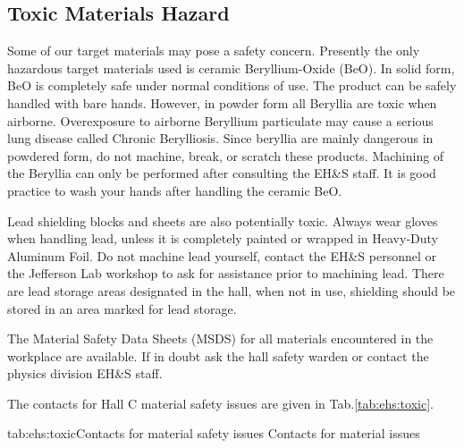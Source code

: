\begin{safetyen}{0}{0}
\section{Toxic Materials Hazard} 
\label{sec:toxichazard}
\end{safetyen}

 Some of our target materials may pose a safety concern. Presently the
 only hazardous target materials used is ceramic Beryllium-Oxide (BeO).
 In solid form, BeO is completely safe under normal conditions of use.
 The product can be safely handled with bare hands. However, in powder form 
 all Beryllia are toxic when airborne. Overexposure to airborne Beryllium particulate 
 may cause a serious lung disease called Chronic Berylliosis. 
 Since beryllia are mainly dangerous in powdered form, do not machine, break, or 
 scratch these products. Machining of the Beryllia can only be performed after 
 consulting the EH\&S staff. It is good practice to wash your hands after handling 
 the ceramic BeO.

 Lead shielding blocks and sheets are also potentially toxic. Always wear gloves 
 when handling lead, unless it is completely painted or wrapped in Heavy-Duty 
 Aluminum Foil. Do not machine lead yourself, contact the EH\&S personnel or 
 the Jefferson Lab workshop to ask for assistance prior to machining lead. There 
 are lead storage areas designated in the hall, when not in use, shielding should 
 be stored in an area marked for lead storage.

 The Material Safety Data Sheets (MSDS) for all materials encountered in the workplace 
 are available. If in doubt ask the hall safety warden or contact the physics division 
 EH\&S staff.

 The contacts for Hall C material safety issues are given in Tab.\ref{tab:ehs:toxic}.
 
 \begin{namestab}{tab:ehs:toxic}{Contacts for material safety issues}{%
   Contacts for material issues}
 \end{namestab}

\obsolete{
} 

